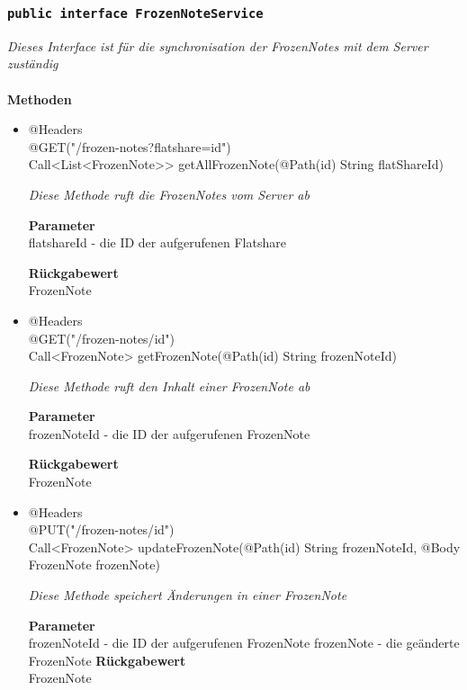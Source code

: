 	\subsubsection{\texttt{public interface FrozenNoteService }}
\textit{Dieses Interface ist für die synchronisation der FrozenNotes mit dem Server zuständig}\\
\\
	\textbf{Methoden} \\
		\begin{itemize}
		\item{@Headers\\ @GET("/frozen-notes?flatshare={id}")\\
Call<List<FrozenNote>> getAllFrozenNote(@Path(\grqq id\grqq) String flatShareId)}

		\textit{Diese Methode ruft die FrozenNotes vom Server ab}

		\textbf{Parameter} \\
	flatshareId -  die ID der aufgerufenen Flatshare  

		\textbf{Rückgabewert} \\
	FrozenNote

      \item{@Headers\\ @GET("/frozen-notes/{id}")\\ Call<FrozenNote> getFrozenNote(@Path(\grqq id\grqq) String frozenNoteId)}

		\textit{Diese Methode ruft den Inhalt einer FrozenNote ab }

		\textbf{Parameter} \\
		frozenNoteId - die ID der aufgerufenen FrozenNote  

		\textbf{Rückgabewert} \\
	FrozenNote

	 \item{@Headers\\ @PUT("/frozen-notes/{id}")\\ Call<FrozenNote> updateFrozenNote(@Path(\grqq id\grqq) String frozenNoteId, @Body FrozenNote frozenNote)}

		\textit{Diese Methode speichert Änderungen  in einer FrozenNote}

		\textbf{Parameter} \\
		frozenNoteId - die ID der aufgerufenen FrozenNote  
		frozenNote - die geänderte FrozenNote
		\textbf{Rückgabewert} \\
	FrozenNote

	 \end{itemize}


